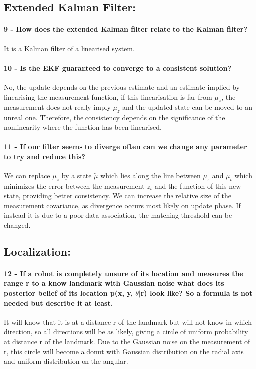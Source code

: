 \documentclass[12pt]{article}
\begin{document}
\subsection{Extended Kalman Filter:}
\paragraph{9 - How does the extended Kalman filter relate to the Kalman filter?}
It is a Kalman filter of a linearised system.
\paragraph{10 - Is the EKF guaranteed to converge to a consistent solution?}
No, the update depends on the previous estimate and an estimate implied by linearising the measurement function, if this linearisation is far from \(\mu_z\), the measurement does not really imply \(\mu_z\) and the updated state can be moved to an unreal one. Therefore, the consistency depends on the significance of the nonlinearity where the function has been linearised.
\paragraph{11 - If our filter seems to diverge often can we change any parameter to try
and reduce this?}
We can replace \(\mu_z\) by a state \(\tilde{\mu}\) which lies along the line between \(\mu_z\) and \(\bar{\mu}_t\) which minimizes the error between the measurement \(z_t\) and the function of this new state, providing better consistency. We can increase the relative size of the measurement covariance, as divergence occurs most likely on update phase. If instead it is due to a poor data association, the matching threshold can be changed.

\subsection{Localization:}

\paragraph{12 - If a robot is completely unsure of its location and measures the range r
to a know landmark with Gaussian noise what does its posterior belief of
its location p(x, y, \(\theta|\)r) look like? So a formula is not needed but describe
it at least.} It will know that it is at a distance r of the landmark but will not know in which direction, so all directions will be as likely, giving a circle of uniform probability at distance r of the landmark. Due to the Gaussian noise on the measurement of r, this circle will  become a donut with Gaussian distribution on the radial axis and uniform distribution on the angular.
\end{document}
